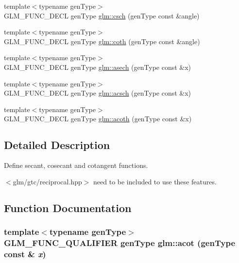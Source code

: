 \begin{CompactItemize}
{\footnotesize template$<$typename genType$>$ }\\GLM\_\-FUNC\_\-DECL genType \hyperlink{group__gtc__reciprocal_g094e1e421d5d9320d4364deb82adb428}{glm::csch} (genType const \&angle)
\item 
{\footnotesize template$<$typename genType$>$ }\\GLM\_\-FUNC\_\-DECL genType \hyperlink{group__gtc__reciprocal_g8bc5d51e10b478b061a071eb91258d35}{glm::coth} (genType const \&angle)
\item 
{\footnotesize template$<$typename genType$>$ }\\GLM\_\-FUNC\_\-DECL genType \hyperlink{group__gtc__reciprocal_g05d1bc30693d02a9a08c9044d75c5333}{glm::asech} (genType const \&x)
\item 
{\footnotesize template$<$typename genType$>$ }\\GLM\_\-FUNC\_\-DECL genType \hyperlink{group__gtc__reciprocal_gb24c5c23d9d3d10517ad80f5af515b0e}{glm::acsch} (genType const \&x)
\item 
{\footnotesize template$<$typename genType$>$ }\\GLM\_\-FUNC\_\-DECL genType \hyperlink{group__gtc__reciprocal_g651e435e3e8f63b1ea1da0e5e7581864}{glm::acoth} (genType const \&x)
\end{CompactItemize}


\subsection{Detailed Description}
Define secant, cosecant and cotangent functions. 

$<$glm/gtc/reciprocal.hpp$>$ need to be included to use these features. 

\subsection{Function Documentation}
\hypertarget{group__gtc__reciprocal_ge06055493cfcf5e3732cf330d81fd186}{
\subsubsection[acot]{\setlength{\rightskip}{0pt plus 5cm}template$<$typename genType$>$ GLM\_\-FUNC\_\-QUALIFIER genType glm::acot (genType const \& {\em x})}}
\label{group__gtc__reciprocal_ge06055493cfcf5e3732cf330d81fd186}


